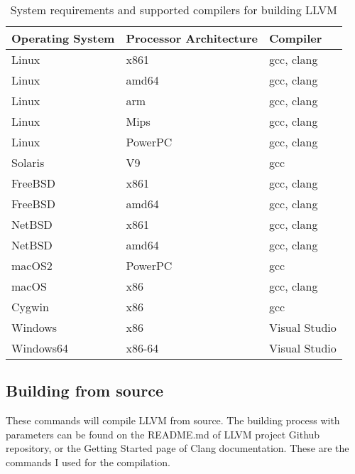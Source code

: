 \begin{table}[H]
	\centering
	\begin{tabular}{ | m{} | m{} | m{} | }
		\hline
		\textbf{Operating System} & \textbf{Processor Architecture} & \textbf{Compiler} \\
		\hline \hline
		Linux & x861 & gcc, clang \\
		\hline
		Linux & amd64 & gcc, clang \\
		\hline
		Linux & arm & gcc, clang \\
		\hline
		Linux & Mips & gcc, clang \\
		\hline
		Linux & PowerPC & gcc, clang \\
		\hline
		Solaris & V9 & gcc \\
		\hline
		FreeBSD & x861 & gcc, clang \\
		\hline
		FreeBSD & amd64 & gcc, clang \\
		\hline
		NetBSD & x861 & gcc, clang \\
		\hline
		NetBSD & amd64 & gcc, clang \\
		\hline
		macOS2 & PowerPC & gcc \\
		\hline
		macOS & x86 & gcc, clang \\
		\hline
		Cygwin & x86 & gcc \\
		\hline
		Windows & x86 & Visual Studio \\
		\hline
		Windows64 & x86-64 & Visual Studio \\
		\hline
	\end{tabular}
	\caption{System requirements and supported compilers for building LLVM}
	\label{tab:example-1}
\end{table}

\subsection{Building from source}

These commands will compile LLVM from source. The building process with parameters can be found on the README.md of
LLVM project Github repository, or the Getting Started page of Clang documentation. These are the commands I used for
the compilation. %

